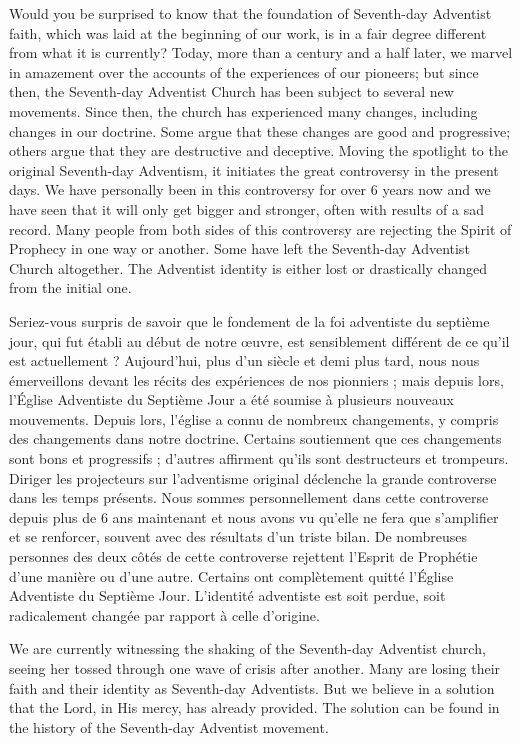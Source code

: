 Would you be surprised to know that the foundation of Seventh-day Adventist faith, which was laid at the beginning of our work, is in a fair degree different from what it is currently? Today, more than a century and a half later, we marvel in amazement over the accounts of the experiences of our pioneers; but since then, the Seventh-day Adventist Church has been subject to several new movements. Since then, the church has experienced many changes, including changes in our doctrine. Some argue that these changes are good and progressive; others argue that they are destructive and deceptive. Moving the spotlight to the original Seventh-day Adventism, it initiates the great controversy in the present days. We have personally been in this controversy for over 6 years now and we have seen that it will only get bigger and stronger, often with results of a sad record. Many people from both sides of this controversy are rejecting the Spirit of Prophecy in one way or another. Some have left the Seventh-day Adventist Church altogether. The Adventist identity is either lost or drastically changed from the initial one.


Seriez-vous surpris de savoir que le fondement de la foi adventiste du septième jour, qui fut établi au début de notre œuvre, est sensiblement différent de ce qu'il est actuellement ? Aujourd'hui, plus d'un siècle et demi plus tard, nous nous émerveillons devant les récits des expériences de nos pionniers ; mais depuis lors, l'Église Adventiste du Septième Jour a été soumise à plusieurs nouveaux mouvements. Depuis lors, l'église a connu de nombreux changements, y compris des changements dans notre doctrine. Certains soutiennent que ces changements sont bons et progressifs ; d'autres affirment qu'ils sont destructeurs et trompeurs. Diriger les projecteurs sur l'adventisme original déclenche la grande controverse dans les temps présents. Nous sommes personnellement dans cette controverse depuis plus de 6 ans maintenant et nous avons vu qu'elle ne fera que s'amplifier et se renforcer, souvent avec des résultats d'un triste bilan. De nombreuses personnes des deux côtés de cette controverse rejettent l'Esprit de Prophétie d'une manière ou d'une autre. Certains ont complètement quitté l'Église Adventiste du Septième Jour. L'identité adventiste est soit perdue, soit radicalement changée par rapport à celle d'origine.


We are currently witnessing the shaking of the Seventh-day Adventist church, seeing her tossed through one wave of crisis after another. Many are losing their faith and their identity as Seventh-day Adventists. But we believe in a solution that the Lord, in His mercy, has already provided. The solution can be found in the history of the Seventh-day Adventist movement.


